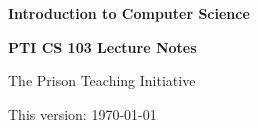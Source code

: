\begin{titlepage}
    \vspace*{5cm}

    {\noindent \Huge \bfseries{Introduction to Computer Science}}

    \vspace{3cm}

    {\noindent \large \textbf{PTI CS 103 Lecture Notes}}

    \vspace{1.5cm}

    {\noindent \large The Prison Teaching Initiative}

    \vfill

    {\noindent \small This version: \today}
\end{titlepage}